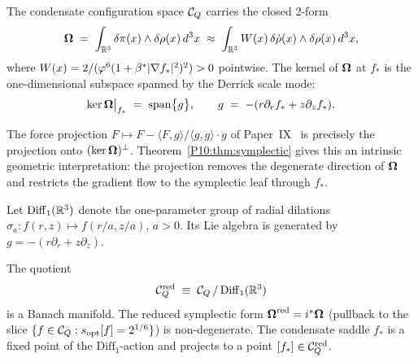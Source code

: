 

\begin{theorem}
\label{P10:thm:symplectic}
The condensate configuration space $\mathcal{C}_Q$ carries the closed 2-form
\begin{equation}
  \boldsymbol{\Omega}
  \;=\; \int_{\mathbb{R}^3} \delta\pi(x)\wedge\delta\rho(x)\,d^3x
  \;\approx\; \int_{\mathbb{R}^3} W(x)\,\delta\dot\rho(x)\wedge\delta\rho(x)\,d^3x,
  \label{P10:eq:symplectic}
\end{equation}
where $W(x) = 2/(\varphi^6(1+\beta^{*}|\nabla f_*|^2)^2)>0$ pointwise.
The kernel of $\boldsymbol{\Omega}$ at $f_*$ is the one-dimensional
subspace spanned by the Derrick scale mode:
\begin{equation}
  \ker\boldsymbol{\Omega}\big|_{f_*}
  \;=\; \mathrm{span}\bigl\{g\bigr\},
  \qquad
  g \;=\; -(r\partial_r f_* + z\partial_z f_*).
  \label{P10:eq:kernel}
\end{equation}
\end{theorem}

\begin{remark}
\label{P10:rem:connection_paper9}
The force projection $F\mapsto F - \langle F,g\rangle/\langle g,g\rangle\cdot g$
of Paper~IX~\cite{Paper9} is precisely the projection onto
$(\ker\boldsymbol{\Omega})^\perp$.
Theorem~\ref{P10:thm:symplectic} gives this an intrinsic geometric
interpretation: the projection removes the degenerate direction of
$\boldsymbol{\Omega}$ and restricts the gradient flow to the symplectic
leaf through $f_*$.
\end{remark}

\begin{definition}
\label{P10:def:derrick_dilation}
Let $\mathrm{Diff}_1(\mathbb{R}^3)$ denote the one-parameter group of
radial dilations $\sigma_a: f(r,z)\mapsto f(r/a,z/a)$, $a>0$.
Its Lie algebra is generated by $g = -(r\partial_r + z\partial_z)$.
\end{definition}

\begin{theorem}
\label{P10:thm:reduction}
The quotient
\begin{equation}
  \mathcal{C}_Q^{\mathrm{red}} \;\equiv\; \mathcal{C}_Q\,/\,\mathrm{Diff}_1(\mathbb{R}^3)
  \label{P10:eq:reduced}
\end{equation}
is a Banach manifold.
The reduced symplectic form
$\boldsymbol{\Omega}^{\mathrm{red}} = i^*\boldsymbol{\Omega}$ (pullback
to the slice $\{f\in\mathcal{C}_Q : s_{\mathrm{opt}}[f] = 2^{1/6}\}$)
is non-degenerate.
The condensate saddle $f_*$ is a fixed point of the
$\mathrm{Diff}_1$-action and projects to a point
$[f_*]\in\mathcal{C}_Q^{\mathrm{red}}$.
\end{theorem}

